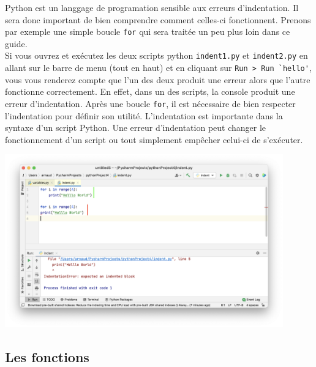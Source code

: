 Python est un langgage de programation sensible aux erreurs d'indentation. Il sera donc important de bien comprendre comment celles-ci fonctionnent. Prenons par exemple une simple boucle \lstinline{for} qui sera traitée un peu plus loin dans ce guide.\\

Si vous ouvrez et exécutez les deux scripts python \lstinline{indent1.py} et \lstinline{indent2.py} en allant sur le barre de menu (tout en haut) et en cliquant sur \lstinline{Run > Run `hello'}, vous vous renderez compte que l'un des deux produit une erreur alors que l'autre fonctionne correctement. En effet, dans un des scripts, la console produit une erreur d'indentation. Après une boucle \lstinline{for}, il est nécessaire de bien respecter l'indentation pour définir son utilité. L'indentation est importante dans la syntaxe d'un script Python. Une erreur d'indentation peut changer le fonctionnement d'un script ou tout simplement empêcher celui-ci de s'exécuter.



\begin{center}	
\includegraphics[width=12cm]{7}	
\end{center}


\subsection{Les fonctions}

